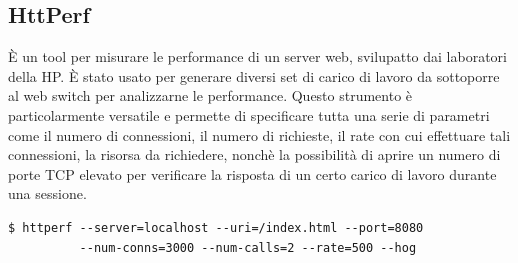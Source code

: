 \documentclass[italian]{tktltiki2}
\begin{document}
\subsection{HttPerf} \label{ssec: httperf}
È un tool per misurare le performance di un server web, svilupatto dai laboratori della HP\cite{httperf}. È stato usato per generare diversi set di carico di lavoro da sottoporre al web switch per analizzarne le performance. Questo strumento è particolarmente versatile e permette di specificare tutta una serie di parametri come il numero di connessioni, il numero di richieste, il rate con cui effettuare tali connessioni, la risorsa da richiedere, nonchè la possibilità di aprire un numero di porte TCP elevato per verificare la risposta di un certo carico di lavoro durante una sessione.
\begin{lstlisting}
$ httperf --server=localhost --uri=/index.html --port=8080 
          --num-conns=3000 --num-calls=2 --rate=500 --hog

\end{lstlisting}
\end{document}
